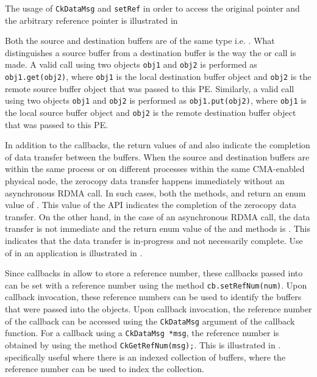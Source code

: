 The usage of \texttt{CkDataMsg} and \texttt{setRef} in order to access the original
pointer and the arbitrary reference pointer is illustrated in

Both the source and destination buffers are of the same type i.e. .
What distinguishes a source buffer from a destination buffer is the way the  or
 call is made. A valid  call using two  objects \texttt{obj1} and
\texttt{obj2} is performed as \texttt{obj1.get(obj2)}, where \texttt{obj1} is the local destination
buffer object and \texttt{obj2} is the remote source buffer object that was passed to this PE.
Similarly, a valid  call using two  objects \texttt{obj1} and
\texttt{obj2} is performed as \texttt{obj1.put(obj2)}, where \texttt{obj1} is the local source buffer
object and \texttt{obj2} is the remote destination buffer object that was passed to this PE.

In addition to the callbacks, the return values of  and  also indicate the
completion of data transfer between the buffers. When the source and destination buffers are
within the same process or on different processes within the same CMA-enabled physical node,
the zerocopy data transfer happens immediately without an asynchronous
RDMA call. In such cases, both the methods,  and  return an enum value of
. This value of the API indicates the completion of the zerocopy data
transfer. On the other hand, in the case of an asynchronous RDMA call, the data transfer is not immediate
and the return enum value of the  and  methods is .
This indicates that the data transfer is in-progress and not necessarily complete. Use of
 in an application is illustrated in
.

Since callbacks in \charmpp{} allow to store a reference number, these
callbacks passed into  can be set with a
reference number using the method \texttt{cb.setRefNum(num)}. Upon callback
invocation, these reference numbers can be used to identify the buffers that
were passed into the  objects. Upon callback invocation, the
reference number of the callback can be accessed using the \texttt{CkDataMsg}
argument of the callback function. For a callback using a \texttt{CkDataMsg *msg},
the reference number is obtained by using the method \texttt{CkGetRefNum(msg);}.
This is illustrated in .
specifically useful where there is an indexed collection of buffers, where the
reference number can be used to index the collection.

